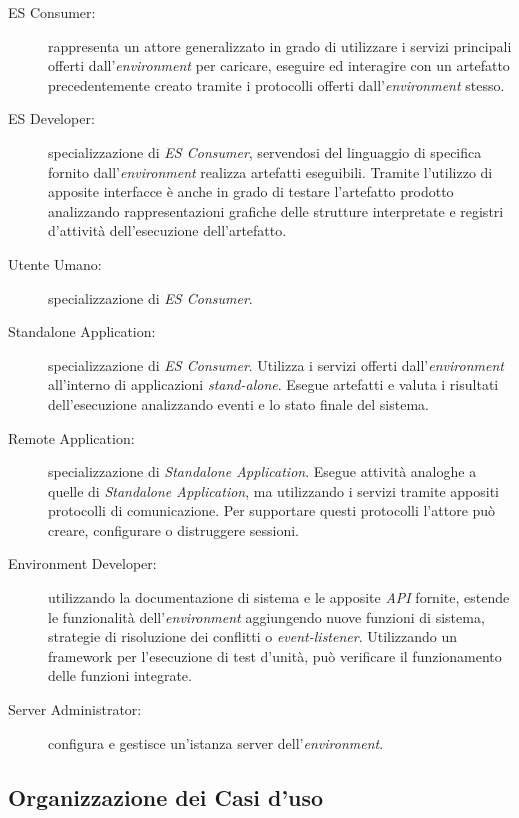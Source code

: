 \begin{description}
	\item[ES Consumer:] rappresenta un attore generalizzato in grado di utilizzare i servizi principali offerti dall'\emph{environment} per caricare, eseguire ed interagire con un artefatto precedentemente creato tramite i protocolli offerti dall'\emph{environment} stesso.
	
	\item[ES Developer:] specializzazione di \emph{ES Consumer}, servendosi del linguaggio di specifica fornito dall'\emph{environment} realizza artefatti eseguibili. Tramite l'utilizzo di apposite interfacce è anche in grado di testare l'artefatto prodotto analizzando rappresentazioni grafiche delle strutture interpretate e registri d'attività dell'esecuzione dell'artefatto.
	\item[Utente Umano:] specializzazione di \emph{ES Consumer}.
	
	\item[Standalone Application:] specializzazione di \emph{ES Consumer}. Utilizza i servizi offerti dall'\emph{environment} all'interno di applicazioni \emph{stand-alone}. Esegue artefatti e valuta i risultati dell'esecuzione analizzando eventi e lo stato finale del sistema.
	
	\item[Remote Application:] specializzazione di \emph{Standalone Application}. Esegue attività analoghe a quelle di \emph{Standalone Application}, ma utilizzando i servizi tramite appositi protocolli di comunicazione. Per supportare questi protocolli l'attore può creare, configurare o distruggere sessioni.
	
	\item[Environment Developer:] utilizzando la documentazione di sistema e le apposite \emph{API} fornite, estende le funzionalità dell'\emph{environment} aggiungendo nuove funzioni di sistema, strategie di risoluzione dei conflitti o \emph{event-listener}. Utilizzando un framework per l'esecuzione di test d'unità, può verificare il funzionamento delle funzioni integrate.
	
	\item[Server Administrator:] configura e gestisce un'istanza server dell'\emph{environment}.
	
\end{description}

\subsection{Organizzazione dei Casi d'uso}

